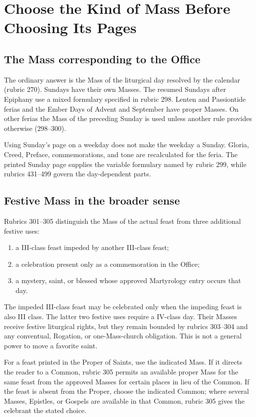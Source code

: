 \section{Choose the Kind of Mass Before Choosing Its Pages}

\subsection{The Mass corresponding to the Office}

The ordinary answer is the Mass of the liturgical day resolved by the calendar (rubric 270). Sundays have their own Masses. The resumed Sundays after Epiphany use a mixed formulary specified in rubric 298. Lenten and Passiontide ferias and the Ember Days of Advent and September have proper Masses. On other ferias the Mass of the preceding Sunday is used unless another rule provides otherwise (298--300).

Using Sunday's page on a weekday does not make the weekday a Sunday. Gloria, Creed, Preface, commemorations, and tone are recalculated for the feria. The printed Sunday page supplies the variable formulary named by rubric 299, while rubrics 431--499 govern the day-dependent parts.

\subsection{Festive Mass in the broader sense}

Rubrics 301--305 distinguish the Mass of the actual feast from three additional festive uses:

\begin{enumerate}[leftmargin=1.45em]
\item a III-class feast impeded by another III-class feast;
\item a celebration present only as a commemoration in the Office;
\item a mystery, saint, or blessed whose approved Martyrology entry occurs that day.
\end{enumerate}

The impeded III-class feast may be celebrated only when the impeding feast is also III class. The latter two festive uses require a IV-class day. Their Masses receive festive liturgical rights, but they remain bounded by rubrics 303--304 and any conventual, Rogation, or one-Mass-church obligation. This is not a general power to move a favorite saint.

For a feast printed in the Proper of Saints, use the indicated Mass. If it directs the reader to a Common, rubric 305 permits an available proper Mass for the same feast from the approved Masses for certain places in lieu of the Common. If the feast is absent from the Proper, choose the indicated Common; where several Masses, Epistles, or Gospels are available in that Common, rubric 305 gives the celebrant the stated choice.

